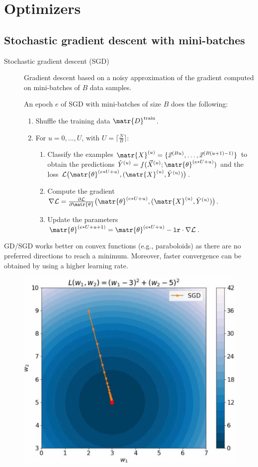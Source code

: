 \chapter{Optimizers}



\section{Stochastic gradient descent with mini-batches}

\begin{description}
    \item[Stochastic gradient descent (SGD)] 
        Gradient descent based on a noisy approximation of the gradient computed on mini-batches of $B$ data samples.

        An epoch $e$ of SGD with mini-batches of size $B$ does the following:
        \begin{enumerate}
            \item Shuffle the training data $\matr{D}^\text{train}$.
            \item For $u = 0, \dots, U$, with $U = \lceil \frac{N}{B} \rceil$:
            \begin{enumerate}
                \item Classify the examples $\matr{X}^{(u)} = \{ \vec{x}^{(Bu)}, \dots, \vec{x}^{(B(u+1)-1)} \}$ 
                    to obtain the predictions $\hat{Y}^{(u)} = f(\vec{X}^{(u)}; \matr{\theta}^{(e*U+u)})$
                    and the loss $\mathcal{L}\big( \matr{\theta}^{(e*U+u)}, (\matr{X}^{(u)}, \hat{Y}^{(u)}) \big)$.
                \item Compute the gradient $\nabla \mathcal{L} = \frac{\partial\mathcal{L}}{\partial \matr{\theta}}\big( \matr{\theta}^{(e*U+u)}, (\matr{X}^{(u)}, \hat{Y}^{(u)}) \big)$.
                \item Update the parameters $\matr{\theta}^{(e*U+u+1)} = \matr{\theta}^{(e*U+u)} - \texttt{lr} \cdot \nabla \mathcal{L}$.
            \end{enumerate}
        \end{enumerate}
\end{description}

\begin{remark}[Spheres] 
    GD/SGD works better on convex functions (e.g., paraboloids) as there are no preferred directions to reach a minimum. Moreover, faster convergence can be obtained by using a higher learning rate.

    \begin{figure}[H]
        \centering
        \includegraphics[width=0.35\linewidth]{./img/sgd_sphere.jpg}
    \end{figure}
\end{remark}

